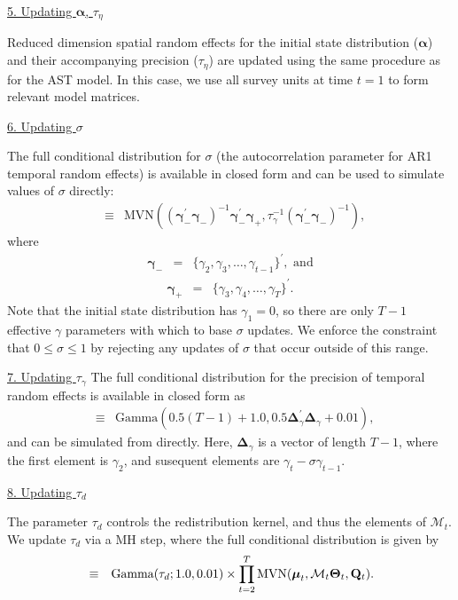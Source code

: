\documentclass[12pt,fleqn]{article}
\begin{document}
\begin{flushleft}
\underline{5. Updating $\boldsymbol{\alpha}$, $\tau_\eta$}

Reduced dimension spatial random effects for the initial state distribution ($\boldsymbol{\alpha}$) and their accompanying precision ($\tau_\eta$) are updated using the same procedure as for the AST model.  In this case, we use all survey units at time $t=1$ to form relevant model matrices.

\underline{6. Updating $\sigma$}

The full conditional distribution for $\sigma$ (the autocorrelation parameter for AR1 temporal random effects) is available in closed form and can be used to simulate values of $\sigma$ directly:
\begin{eqnarray*}
  [\sigma | \cdot] & \equiv & \textrm{MVN}( (\boldsymbol{\gamma}_-^\prime \boldsymbol{\gamma}_-)^{-1} \boldsymbol{\gamma}_-^\prime \boldsymbol{\gamma}_+, \tau_\gamma^{-1} (\boldsymbol{\gamma}_-^\prime \boldsymbol{\gamma}_-)^{-1} ),
\end{eqnarray*}
where
\begin{eqnarray*}
   \boldsymbol{\gamma}_- & = & \{ \gamma_2, \gamma_3, \hdots, \gamma_{t-1} \}^\prime, \text{ and}
\end{eqnarray*}
\begin{eqnarray*}
   \boldsymbol{\gamma}_+ & = & \{ \gamma_3, \gamma_4, \hdots, \gamma_{T} \}^\prime.
\end{eqnarray*}
Note that the initial state distribution has $\gamma_1 = 0$, so there are only $T-1$ effective $\gamma$ parameters with which to base $\sigma$ updates. We enforce the constraint that $0 \le \sigma \le 1$ by rejecting any updates of $\sigma$ that occur outside of this range.

\underline{7. Updating $\tau_\gamma$}
The full conditional distribution for the precision of temporal random effects is available in closed form as
\begin{eqnarray*}
  [\tau_\gamma | \cdot] & \equiv & \textrm{Gamma}(0.5 (T-1) + 1.0,0.5 \boldsymbol{\Delta}_\gamma^\prime \boldsymbol{\Delta}_\gamma + 0.01),
\end{eqnarray*}
and can be simulated from directly.
 Here, $\boldsymbol{\Delta}_\gamma$ is a vector of length $T-1$, where the first element is $\gamma_2$, and susequent elements are $\gamma_{t}-\sigma \gamma_{t-1}$.


\underline{8.  Updating $\tau_d$}

The parameter $\tau_d$ controls the redistribution kernel, and thus the elements of $\mathcal{M}_t$.  We update
$\tau_d$ via a MH step, where the full conditional distribution is given by
\begin{eqnarray*}
  [\tau_d | \cdot] & \equiv & \textrm{Gamma}(\tau_d;1.0,0.01) \times  \prod_{t=2}^T \textrm{MVN}(\boldsymbol{\mu}_t, \mathcal{M}_t \boldsymbol{\Theta}_t,{\bf Q}_t).
\end{eqnarray*}




\end{flushleft}
\end{document}
